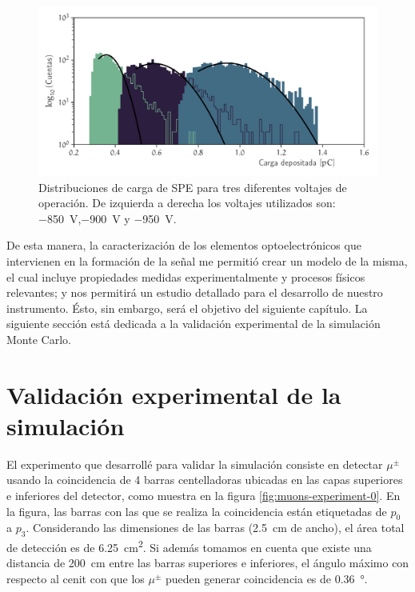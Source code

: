 \begin{figure}
        \centering
        \includegraphics[width=\textwidth]{mapmt_charge.pdf}
        \caption{Distribuciones de carga de SPE para tres diferentes voltajes de operación. De izquierda a derecha los voltajes utilizados son: \SI{-850}{\volt},\SI{-900}{\volt} y \SI{-950}{\volt}.}
        \label{fig:mapmt_charge}
\end{figure}

De esta manera, la caracterización de los elementos optoelectrónicos que intervienen en la formación de la señal me permitió crear un modelo de la misma, el cual incluye propiedades medidas experimentalmente y procesos físicos relevantes; y nos permitirá un estudio detallado para el desarrollo de nuestro instrumento. Ésto, sin embargo, será el objetivo del siguiente capítulo. La siguiente sección está dedicada a la validación experimental de la simulación Monte Carlo.

\section{Validación experimental de la simulación}

El experimento que desarrollé para validar la simulación consiste en detectar $\mu^{\pm}$ usando la coincidencia de \num{4} barras centelladoras ubicadas en las capas superiores e inferiores del detector, como muestra en la figura \ref{fig:muons-experiment-0}. En la figura, las barras con las que se realiza la coincidencia están etiquetadas de $p_{0}$ a $p_{3}$. Considerando las dimensiones de las barras (\SI{2.5}{\cm} de ancho), el área total de detección es de \SI{6.25}{\cm\squared}. Si además tomamos en cuenta que existe una distancia de \SI{200}{\cm} entre las barras superiores e inferiores, el ángulo máximo con respecto al cenit con que los $\mu^{\pm}$ pueden generar coincidencia es de \SI{0.36}{\degree}.

